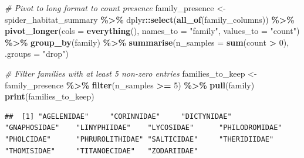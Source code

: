 \documentclass[
]{article}
\newenvironment{Shaded}{\begin{snugshade}}{\end{snugshade}}
\newcommand{\AttributeTok}[1]{\textcolor[rgb]{0.13,0.29,0.53}{#1}}
\newcommand{\CommentTok}[1]{\textcolor[rgb]{0.56,0.35,0.01}{\textit{#1}}}
\newcommand{\DecValTok}[1]{\textcolor[rgb]{0.00,0.00,0.81}{#1}}
\newcommand{\FunctionTok}[1]{\textcolor[rgb]{0.13,0.29,0.53}{\textbf{#1}}}
\newcommand{\NormalTok}[1]{#1}
\newcommand{\OtherTok}[1]{\textcolor[rgb]{0.56,0.35,0.01}{#1}}
\newcommand{\SpecialCharTok}[1]{\textcolor[rgb]{0.81,0.36,0.00}{\textbf{#1}}}
\newcommand{\StringTok}[1]{\textcolor[rgb]{0.31,0.60,0.02}{#1}}
\begin{document}
\begin{Shaded}
\begin{Highlighting}[]
\CommentTok{\# Pivot to long format to count presence}
\NormalTok{family\_presence }\OtherTok{\textless{}{-}}\NormalTok{ spider\_habitat\_summary }\SpecialCharTok{\%\textgreater{}\%}
\NormalTok{  dplyr}\SpecialCharTok{::}\FunctionTok{select}\NormalTok{(}\FunctionTok{all\_of}\NormalTok{(family\_columns)) }\SpecialCharTok{\%\textgreater{}\%}
  \FunctionTok{pivot\_longer}\NormalTok{(}\AttributeTok{cols =} \FunctionTok{everything}\NormalTok{(), }\AttributeTok{names\_to =} \StringTok{"family"}\NormalTok{, }\AttributeTok{values\_to =} \StringTok{"count"}\NormalTok{) }\SpecialCharTok{\%\textgreater{}\%}
  \FunctionTok{group\_by}\NormalTok{(family) }\SpecialCharTok{\%\textgreater{}\%}
  \FunctionTok{summarise}\NormalTok{(}\AttributeTok{n\_samples =} \FunctionTok{sum}\NormalTok{(count }\SpecialCharTok{\textgreater{}} \DecValTok{0}\NormalTok{), }\AttributeTok{.groups =} \StringTok{"drop"}\NormalTok{)}

\CommentTok{\# Filter families with at least 5 non{-}zero entries}
\NormalTok{families\_to\_keep }\OtherTok{\textless{}{-}}\NormalTok{ family\_presence }\SpecialCharTok{\%\textgreater{}\%}
  \FunctionTok{filter}\NormalTok{(n\_samples }\SpecialCharTok{\textgreater{}=} \DecValTok{5}\NormalTok{) }\SpecialCharTok{\%\textgreater{}\%}
  \FunctionTok{pull}\NormalTok{(family)}
\FunctionTok{print}\NormalTok{(families\_to\_keep)}
\end{Highlighting}
\end{Shaded}

\begin{verbatim}
##  [1] "AGELENIDAE"     "CORINNIDAE"     "DICTYNIDAE"     "GNAPHOSIDAE"    "LINYPHIIDAE"    "LYCOSIDAE"      "PHILODROMIDAE"  "PHOLCIDAE"      "PHRUROLITHIDAE" "SALTICIDAE"     "THERIDIIDAE"    "THOMISIDAE"     "TITANOECIDAE"   "ZODARIIDAE"
\end{verbatim}
\end{document}
